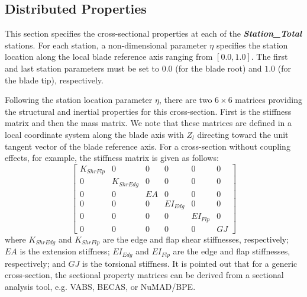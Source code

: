 \subsection{Distributed Properties}

This section specifies the cross-sectional properties at each of the \textbf{\textit{Station\_Total}} stations. 
For each station, a non-dimensional parameter $\eta$ specifies the station location along the local blade reference axis ranging from $[0.0,1.0]$. 
The first and last station parameters must be set to $0.0$ (for the blade root) and $1.0$ (for the blade tip), respectively.

Following the station location parameter $\eta$, there are two $6 \times 6$ matrices providing the structural and inertial properties for this cross-section. 
First is the stiffness matrix and then the mass matrix. 
We note that these matrices are defined in a local coordinate system along the blade axis with $Z_{l}$ directing toward the unit tangent vector of the blade reference axis. 
For a cross-section without coupling effects, for example, the stiffness matrix is given as follows:
\begin{equation}
    \label{Stiffness}
    \begin{bmatrix}
    K_{ShrFlp} & 0 & 0 & 0 & 0 & 0 \\
    0 & K_{ShrEdg} & 0 & 0 & 0 & 0 \\
    0 & 0& EA & 0 & 0 & 0 \\
    0 & 0 & 0 & EI_{Edg} & 0 & 0 \\
    0 & 0 & 0 & 0 & EI_{Flp} & 0 \\
    0 & 0 & 0 & 0 & 0 & GJ
    \end{bmatrix}
\end{equation}
where $K_{ShrEdg}$ and $K_{ShrFlp}$ are the edge and flap shear stiffnesses, respectively; $EA$ is the extension stiffness; $EI_{Edg}$ and $EI_{Flp}$ are the edge and flap stiffnesses, respectively; and $GJ$ is the torsional stiffness. It is pointed out that for a generic cross-section, the sectional property matrices can be derived from a sectional analysis tool, e.g. VABS, BECAS, or NuMAD/BPE.

